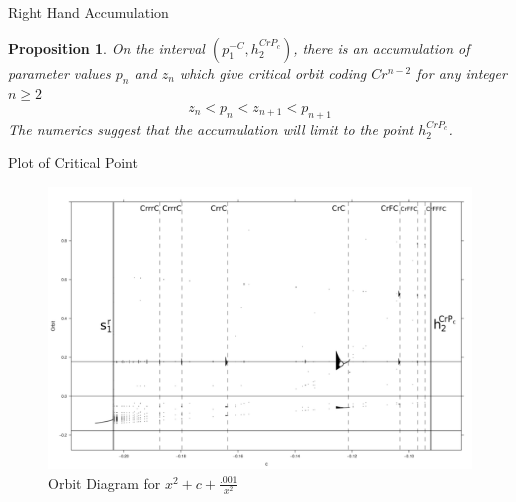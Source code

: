 \documentclass{beamer}
\newtheorem{proposition}{\bf Proposition}
\newcommand{\<}{\left\langle}
\renewcommand{\>}{\right\rangle} %
\renewcommand{\*}{\cdot} %
\newcommand{\pl}{p^{-C}_1}
\newcommand{\pr}{h^{CrP_c}_2}
\begin{document}
\begin{frame}{Right Hand Accumulation}
	\begin{proposition}
		On the interval $ (\pl, \pr)$, there is an accumulation of parameter values $p_n$ and $z_n$ which give critical orbit coding $Cr^{n-2}$ for any integer $n \geq 2$
		\[
		z_n < p_n < z_{n+1} < p_{n+1}
		\]
		The numerics suggest that the accumulation will limit to the point $h_2^{CrP_c}$.
	\end{proposition}
\end{frame}

\begin{frame}{Plot of Critical Point}
	\begin{figure}
		\centering
		\includegraphics[width=.8\textwidth]{./img/over.png}
		\caption{Orbit Diagram for $x^2 + c + \frac{.001}{x^2}$}
	\end{figure}
\end{frame}
\end{document}
